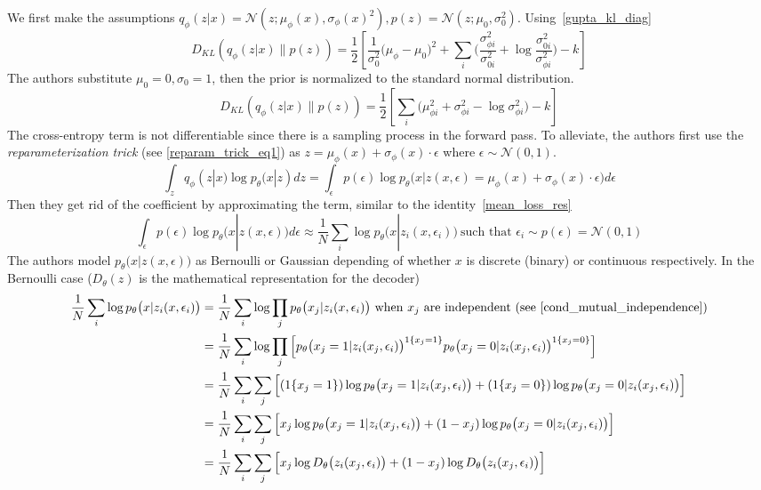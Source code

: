 \documentclass{book}
\numberwithin{equation}{subsection}
\begin{document}
We first make the assumptions $q_\phi(z|x)=\mathcal{N}(z;\mu_\phi(x),\sigma_\phi(x)^2), p(z)=\mathcal{N}(z;\mu_0,\sigma_0^2)$. Using~\ref{gupta_kl_diag}
\begin{equation}
    D_{KL}(q_\phi(z|x) \parallel p(z)) = \frac{1}{2}\left[\frac{1}{\sigma_0^2}\big(\mu_\phi-\mu_0\big)^2 + \sum_i\Big(\frac{\sigma^2_{\phi i}}{\sigma^2_{0i}}+\log\frac{\sigma_{0i}^2}{\sigma^2_{\phi i}}\Big) - k\right]
\end{equation}
The authors substitute $\mu_0=0,\sigma_0=1$, then the prior is normalized to the standard normal distribution.
\begin{equation}
    D_{KL}(q_\phi(z|x) \parallel p(z)) = \frac{1}{2}\left[\sum_i\Big(\mu_{\phi i}^2 + \sigma^2_{\phi i}-\log\sigma_{\phi i}^2\Big) - k\right]
\end{equation}
The cross-entropy term is not differentiable since there is a sampling process in the forward pass. To alleviate, the authors first use the \textit{reparameterization trick} (see \ref{reparam_trick_eq1}) as $z = \mu_\phi(x)+\sigma_\phi(x) \cdot \epsilon$ where $\epsilon \sim \mathcal{N}(0,1)$.
\begin{equation}
    \int_z q_\phi(z|x)\log p_\theta(x|z)dz = \int_\epsilon p(\epsilon)\log p_\theta \big(x|z(x, \epsilon) = \mu_\phi(x)+\sigma_\phi(x) \cdot \epsilon \big)d\epsilon
\end{equation}
Then they get rid of the coefficient by approximating the term, similar to the identity~\ref{mean_loss_res}
\begin{equation}
    \int_\epsilon p(\epsilon)\log p_\theta \big(x|z(x, \epsilon) \big)d\epsilon \approx \frac{1}{N}\sum_i \log p_\theta \big(x|z_i(x, \epsilon_i) \big)\ \text{such that $\epsilon_i \sim p(\epsilon) = \mathcal{N}(0,1)$}
\end{equation}
The authors model $p_\theta \big(x|z(x, \epsilon) \big)$ as Bernoulli or Gaussian depending of whether $x$ is discrete (binary) or continuous respectively. In the Bernoulli case ($D_\theta(z)$ is the mathematical representation for the decoder)
\begin{align}
    \frac{1}{N}\sum_i \log p_\theta \big(x|z_i(x, \epsilon_i) \big)
    &= \frac{1}{N}\sum_i \log \prod_j p_\theta \big(x_j|z_i(x, \epsilon_i) \big)\ \text{when $x_j$ are independent (see~\ref{cond_mutual_independence})}\\
    &= \frac{1}{N}\sum_i \log\prod_j\left[p_\theta \big(x_j=1|z_i(x_j, \epsilon_i) \big)^{1\{x_j=1\}}p_\theta \big(x_j=0|z_i(x_j, \epsilon_i) \big)^{1\{x_j=0\}}\right]\\
    &= \frac{1}{N}\sum_i \sum_j\Big[(1\{x_j=1\})\log p_\theta \big(x_j=1|z_i(x_j, \epsilon_i) \big)+(1\{x_j=0\})\log p_\theta \big(x_j=0|z_i(x_j, \epsilon_i)\big)\Big]\\
    &= \frac{1}{N}\sum_i \sum_j\Big[x_j\log p_\theta \big(x_j=1|z_i(x_j, \epsilon_i) \big)+(1-x_j)\log p_\theta \big(x_j=0|z_i(x_j, \epsilon_i)\big)\Big]\\
    &= \frac{1}{N}\sum_i \sum_j\Big[x_j\log D_\theta\big(z_i(x_j, \epsilon_i) \big)+(1-x_j)\log D_\theta\big(z_i(x_j, \epsilon_i)\big)\Big]
\end{align}
\end{document}
